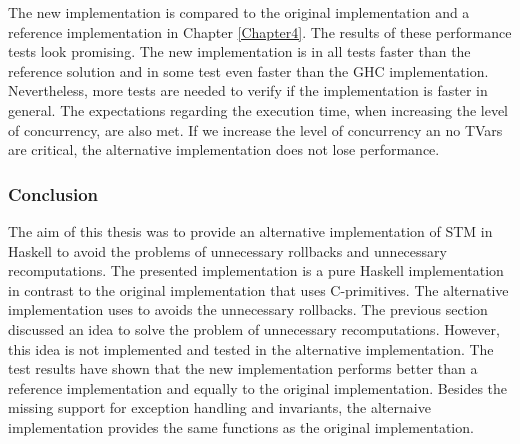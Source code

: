 The new implementation is compared to the original implementation and a reference implementation in
Chapter \ref{Chapter4}. The results of these performance tests look promising. The new implementation
is in all tests faster than the reference solution and in some test even faster than the GHC implementation.
Nevertheless, more tests are needed to verify if the implementation is faster in general. The expectations 
regarding the execution time, when increasing the level of concurrency, are also met. If we increase the 
level of concurrency an no TVars are critical, the alternative implementation does not lose performance.

\subsubsection{Conclusion}
The aim of this thesis was to provide an alternative implementation of STM in Haskell to avoid the 
problems of unnecessary rollbacks and unnecessary recomputations. The presented implementation 
is a pure Haskell implementation in contrast to the original implementation that uses C-primitives.
The alternative implementation uses  to avoids the unnecessary rollbacks. 
The previous section discussed an idea to solve the problem of unnecessary recomputations. However, 
this idea is not implemented and tested in the alternative implementation. The test results have 
shown that the new implementation performs better than a reference implementation and equally to 
the original implementation. Besides the missing support for exception handling and invariants, 
the alternaive implementation provides the same functions as the original implementation. 